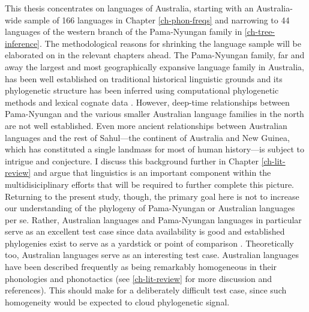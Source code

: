 This thesis concentrates on languages of Australia, starting with an Australia-wide sample of 166 languages in Chapter \ref{ch-phon-freqs} and narrowing to 44 languages of the western branch of the Pama-Nyungan family in \ref{ch-tree-inference}. The methodological reasons for shrinking the language sample will be elaborated on in the relevant chapters ahead. The Pama-Nyungan family, far and away the largest and most geographically expansive language family in Australia, has been well established on traditional historical linguistic grounds and its phylogenetic structure has been inferred using computational phylogenetic methods and lexical cognate data \autocites{bowern_computational_2012}{bouckaert_origin_2018}. However, deep-time relationships between Pama-Nyungan and the various smaller Australian language families in the north are not well established. Even more ancient relationships between Australian languages and the rest of Sahul---the continent of Australia and New Guinea, which has constituted a single landmass for most of human history---is subject to intrigue and conjecture. I discuss this background further in Chapter \ref{ch-lit-review} and argue that linguistics is an important component within the multidisiciplinary efforts that will be required to further complete this picture. Returning to the present study, though, the primary goal here is not to increase our understanding of the phylogeny of Pama-Nyungan or Australian languages per se. Rather, Australian languages and Pama-Nyungan languages in particular serve as an excellent test case since data availability is good \autocites[lexical data in][]{bowern_chirila_2016}{round_ausphon_2017} and established phylogenies exist to serve as a yardstick or point of comparison \autocites{bowern_computational_2012}{bouckaert_origin_2018}. Theoretically too, Australian languages serve as an interesting test case. Australian languages have been described frequently as being remarkably homogeneous in their phonologies and phonotactics \autocites{round_segment_2021}{round_phonotactics_2021} (see \ref{ch-lit-review} for more discussion and references). This should make for a deliberately difficult test case, since such homogeneity would be expected to cloud phylogenetic signal.

